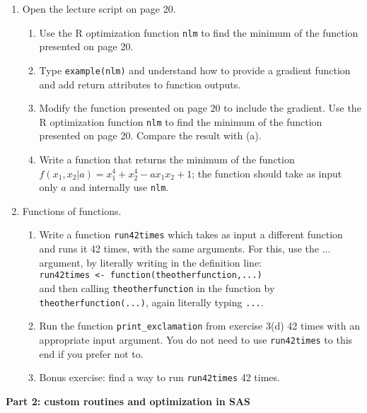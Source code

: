 \begin{enumerate}
\item Open the lecture script on page 20.
\begin{enumerate}
\item Use the R optimization function \texttt{nlm} to find the minimum of the function presented on page 20.
\item Type \texttt{example(nlm)} and understand how to provide a gradient function and add return attributes to function outputs.
\item Modify the function presented on page 20 to include the gradient. Use the R optimization function \texttt{nlm} to find the minimum of the function presented on page 20. Compare the result with (a).
\item Write a function that returns the minimum of the function $f(x_1,x_2|a) = x_1^4+x_2^4-ax_1x_2 + 1$; the function should take as input only $a$ and internally use \texttt{nlm}.
\end{enumerate}

\item Functions of functions.
\begin{enumerate}
\item Write a function \texttt{run42times} which takes as input a different function and runs it 42 times, with the same arguments. For this, use the ... argument, by literally writing in the definition line:\\
    \texttt{run42times <- function(theotherfunction,...)}\\
    and then calling \texttt{theotherfunction} in the function by\\
    \texttt{theotherfunction(...)}, again literally typing \texttt{...}.
\item Run the function \texttt{print\_exclamation} from exercise 3(d) 42 times with an appropriate input argument. You do not need to use \texttt{run42times} to this end if you prefer not to.
\item Bonus exercise: find a way to run \texttt{run42times} 42 times.
\end{enumerate}

\end{enumerate}


{\Large \bf Part 2: custom routines and optimization in SAS}

